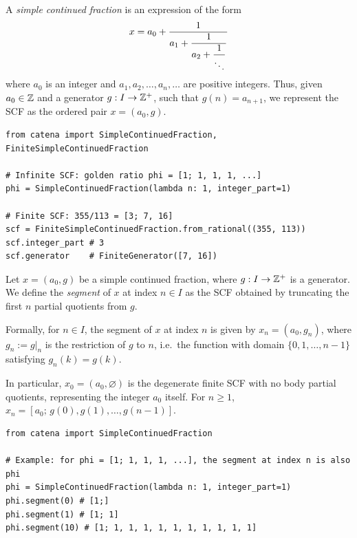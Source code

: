 \begin{definition}
  A \textit{simple continued fraction} is an expression of the form
  \[
    x = a_0 + \cfrac{1}{a_1 + \cfrac{1}{a_2 + \cfrac{1}{\ddots}}}
  \]
  where $a_0$ is an integer and $a_1, a_2, \ldots, a_n, \ldots$ are positive integers. Thus,
  given $a_0 \in \Z$ and a generator $g: I \to \Zp$, such that $g(n) = a_{n+1}$, we represent the SCF as
  the ordered pair $x = (a_0, g)$.
\end{definition}

\begin{catenadef}
\begin{lstlisting}[style=python]
from catena import SimpleContinuedFraction, FiniteSimpleContinuedFraction

# Infinite SCF: golden ratio phi = [1; 1, 1, 1, ...]
phi = SimpleContinuedFraction(lambda n: 1, integer_part=1)

# Finite SCF: 355/113 = [3; 7, 16]
scf = FiniteSimpleContinuedFraction.from_rational((355, 113))
scf.integer_part # 3
scf.generator    # FiniteGenerator([7, 16])
\end{lstlisting}
\end{catenadef}

\begin{definition}[Segment]
    Let $x = (a_0, g)$ be a simple continued fraction, where $g: I \to \Zp$ is a generator. We 
    define the \textit{segment} of $x$ at index $n \in I$ as the SCF obtained by truncating the first 
    $n$ partial quotients from $g$. 
    
    Formally, for $n \in I$, the segment of $x$ at index $n$ is
    given by $x_n = (a_0, g_n)$, where $g_n := g|_n$ is the restriction of $g$ to $n$,
    i.e.\ the function with domain $\{0, 1, \ldots, n-1\}$ satisfying $g_n(k) = g(k)$.
\end{definition}

\begin{remark}
  In particular, $x_0 = (a_0, \varnothing)$ is the degenerate finite SCF with no body
  partial quotients, representing the integer $a_0$ itself.
  For $n \geq 1$, $x_n = [a_0;\, g(0), g(1), \ldots, g(n-1)]$.
\end{remark}

\begin{catenadef}
\begin{lstlisting}[style=python]
from catena import SimpleContinuedFraction

# Example: for phi = [1; 1, 1, 1, ...], the segment at index n is also phi
phi = SimpleContinuedFraction(lambda n: 1, integer_part=1)
phi.segment(0) # [1;]
phi.segment(1) # [1; 1]
phi.segment(10) # [1; 1, 1, 1, 1, 1, 1, 1, 1, 1, 1]
\end{lstlisting}
\end{catenadef}


